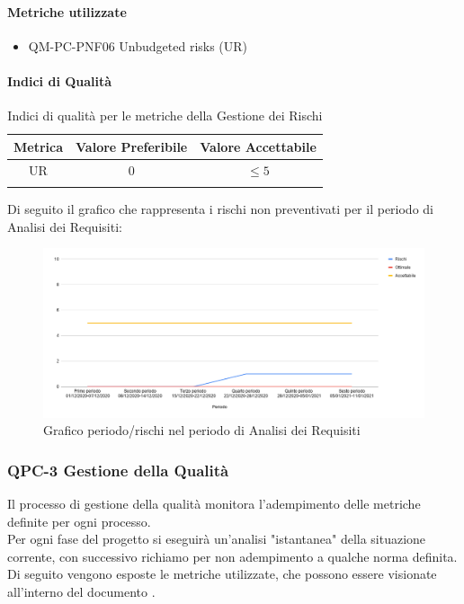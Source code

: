 		\paragraph{Metriche utilizzate}
			\begin{itemize}
				\item QM-PC-PNF06 Unbudgeted risks (UR)
			\end{itemize}
			
		\paragraph{Indici di Qualità}
			\begin{center}
				\begin{longtable}{|c|c|c|}
				\hline
				\rowcolor{lighter-grayer}
				\textbf{Metrica} & \textbf{Valore Preferibile} & \textbf{Valore Accettabile}\\
				\hline
				\endfirsthead
				\hline
				UR & 0 & 	$\leq5$ \\
				\hline
				\caption{Indici di qualità per le metriche della Gestione dei Rischi}
				\end{longtable}
			\end{center}

			\noindent\begin{minipage}{\linewidth}
			Di seguito il grafico che rappresenta i rischi non preventivati per il periodo di Analisi dei Requisiti:
			\begin{figure}[H]
				\centering
				\includegraphics[width=0.9\linewidth]{./res/images/rischi.png}
				\caption{Grafico periodo/rischi nel periodo di Analisi dei Requisiti}
				\label{fig:Grafico rischi non preventivato periodo di Analisi dei Requisiti}
			\end{figure}
			\end{minipage}
			
		
			
	\subsubsection{QPC-3 Gestione della Qualità}
		Il processo di gestione della qualità monitora l'adempimento delle metriche definite per ogni processo.\\
		Per ogni fase del progetto si eseguirà un'analisi "istantanea" della situazione corrente, con successivo richiamo per non adempimento a qualche norma definita.\\
		Di seguito vengono esposte le metriche utilizzate, che possono essere visionate all'interno del documento .\\


